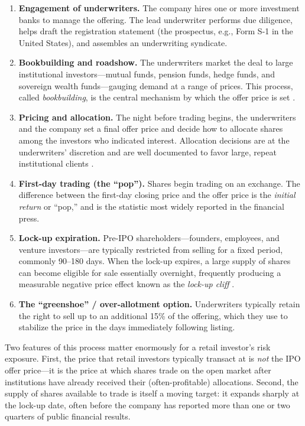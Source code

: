\documentclass[conference]{IEEEtran}
\begin{document}
\begin{enumerate}
    \item \textbf{Engagement of underwriters.} The company hires one or more investment banks to manage the offering. The lead underwriter performs due diligence, helps draft the registration statement (the prospectus, e.g., Form S-1 in the United States), and assembles an underwriting syndicate.
    \item \textbf{Bookbuilding and roadshow.} The underwriters market the deal to large institutional investors---mutual funds, pension funds, hedge funds, and sovereign wealth funds---gauging demand at a range of prices. This process, called \emph{bookbuilding}, is the central mechanism by which the offer price is set \cite{rock1986}.
    \item \textbf{Pricing and allocation.} The night before trading begins, the underwriters and the company set a final offer price and decide how to allocate shares among the investors who indicated interest. Allocation decisions are at the underwriters' discretion and are well documented to favor large, repeat institutional clients \cite{ritter1991}.
    \item \textbf{First-day trading (the ``pop'').} Shares begin trading on an exchange. The difference between the first-day closing price and the offer price is the \emph{initial return} or ``pop,'' and is the statistic most widely reported in the financial press.
    \item \textbf{Lock-up expiration.} Pre-IPO shareholders---founders, employees, and venture investors---are typically restricted from selling for a fixed period, commonly 90--180 days. When the lock-up expires, a large supply of shares can become eligible for sale essentially overnight, frequently producing a measurable negative price effect known as the \emph{lock-up cliff} \cite{loughranritter2004}.
    \item \textbf{The ``greenshoe'' / over-allotment option.} Underwriters typically retain the right to sell up to an additional 15\% of the offering, which they use to stabilize the price in the days immediately following listing.
\end{enumerate}

Two features of this process matter enormously for a retail investor's risk exposure. First, the price that retail investors typically transact at is \emph{not} the IPO offer price---it is the price at which shares trade on the open market after institutions have already received their (often-profitable) allocations. Second, the supply of shares available to trade is itself a moving target: it expands sharply at the lock-up date, often before the company has reported more than one or two quarters of public financial results.
\end{document}
